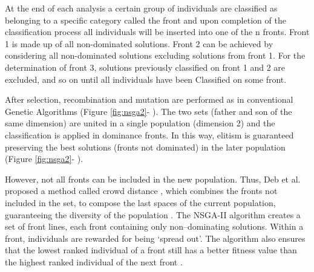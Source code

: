 At the end of each analysis a certain group of individuals are classified as belonging to a specific category called the front and upon completion of the classification process all individuals will be inserted into one of the n fronts. Front 1 is made up of all non-dominated solutions. Front 2 can be achieved by considering all non-dominated solutions excluding solutions from front 1. For the determination of front 3, solutions previously classified on front 1 and 2 are excluded, and so on until all individuals have been Classified on some front.

After selection, recombination and mutation are performed as in conventional Genetic Algorithms (Figure \ref{fig:nsga2}- ). The two sets (father and son of the same dimension) are united in a single population (dimension 2) and the classification is applied in dominance fronts. In this way, elitism is guaranteed preserving the best solutions (fronts not dominated) in the later population (Figure \ref{fig:nsga2}- ).

However, not all fronts can be included in the new population. Thus, Deb et al. proposed a method called crowd distance , which combines the fronts not included in the set, to compose the last spaces of the current population, guaranteeing the diversity of the population \cite{Deb2000}. The NSGA-II algorithm creates a set of front lines, each front containing only non–dominating solutions. Within a front, individuals are rewarded for being ‘spread out’. The algorithm also ensures that the lowest ranked individual of a front still has a better fitness value than the highest ranked individual of the next front \cite{Harman2007}.








